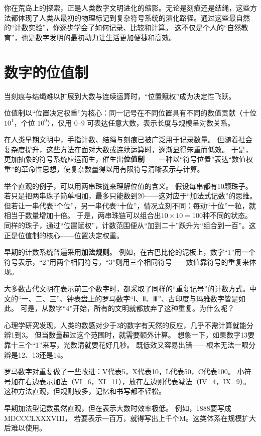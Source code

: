 你在荒岛上的探索，正是人类数字文明进化的缩影。无论是刻痕还是结绳，这些方法都体现了人类从最初的物理标记到复杂符号系统的演化路径。通过这些最自然的“计数实验”，你逐步学会了如何记录、比较和计算。
这不仅是个人的“自然教育”，也是数字发明的最初动力让生活更加便捷和高效。

\section{数字的位值制}
当刻痕与结绳难以扩展到大数与连续运算时，“位置赋权”成为决定性飞跃。

位值制以“位置决定权重”为核心：同一记号在不同位置具有不同的数值贡献（十位 $10^1$，个位 $10^0$），仅用 0–9 可表达任意大数，表示长度与规模呈对数关系。

在人类早期文明中，手指计数、结绳与刻痕已被广泛用于记录数量。  
但随着社会复杂度提升，这些方法在面对大数或连续运算时，逐渐显得笨重而低效。  
于是，更加抽象的符号系统应运而生，催生出{\bf 位值制}——一种以“符号位置”表达“数值权重”的革命性思想，使复杂数量得以用有限符号清晰表示与计算。

举个直观的例子，可以用两串珠链来理解位值的含义。  
假设每串都有10颗珠子。  
若只是把两串珠子简单相加，最多只能数到20——这对应于“加法式记数”的思维。  
但若让一串代表“个位”，另一串代表“十位”，情况立刻不同：每动“十位”一粒，就相当于数量增加十倍。  
于是，两串珠链可以组合出$10\times10=100$种不同的状态。  
同样的珠子，通过“位置赋权”，计数范围便从“加到二十”跃升为“组合到一百”。这正是位值制的核心——位置决定权重。

早期的计数系统普遍采用{\bf 加法规则}。  
例如，在古巴比伦的泥板上，数字“1”用一个符号表示，“2”用两个相同符号，“3”则用三个相同符号——数值靠符号的重复来体现。

大多数古代文明在表示前三个数字时，都采取了同样的“重复记号”的计数方式。中文的“一、二、三”、钟表盘上的罗马数字“Ⅰ、Ⅱ、Ⅲ”、古印度与玛雅数字皆是如此。  
可是，从数字“4”开始，所有的文明就都放弃了这种重复。为什么呢？  

心理学研究发现，人类的数感对少于3的数字有天然的反应，几乎不需计算就能分辨1到3。  
但当数量超过这个范围时，就需要额外计算。  
想象一下，如果数字13要靠十三个“1”来写，光数清就要花好几秒。  
既低效又容易出错——根本无法一眼分辨是12、13还是14。

罗马数字对重复做了一些改进：V代表5，X代表10，L代表50，C代表100。  
小符号加在右边表示加法（VI=6，XI=11），放在左边则代表减法（IV=4，IX=9）。  
这种方法直观，但规则较多，记忆和书写都不轻松。

早期加法型记数虽然直观，但在表示大数时效率极低。  
例如，1888要写成MDCCCLXXXVIII， 若要表示一百万，就得写出上千个M。这类体系在规模扩大后难以使用。

